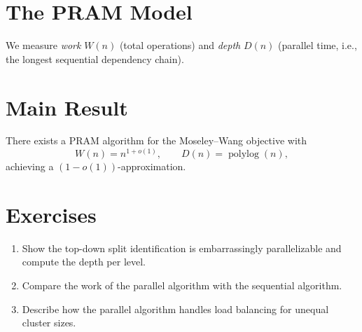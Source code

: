 \section{The PRAM Model}

We measure \emph{work} $W(n)$ (total operations) and \emph{depth} $D(n)$ (parallel time, i.e., the longest sequential dependency chain).

\section{Main Result}

\begin{theorem}
\label{thm:parallel}
There exists a PRAM algorithm for the Moseley--Wang objective with
\[
W(n) = n^{1+o(1)}, \qquad D(n) = \operatorname{polylog}(n),
\]
achieving a $(1-o(1))$-approximation.
\end{theorem}

\section{Exercises}

\begin{enumerate}
  \item Show the top-down split identification is embarrassingly parallelizable and compute the depth per level.
  \item Compare the work of the parallel algorithm with the sequential algorithm.
  \item Describe how the parallel algorithm handles load balancing for unequal cluster sizes.
\end{enumerate}
